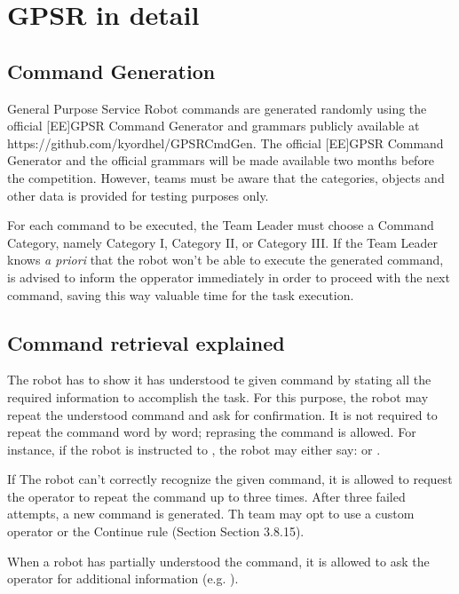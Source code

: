 \chapter{GPSR in detail}
\label{chap:gpsr-appendix}

\section{Command Generation}
General Purpose Service Robot commands are generated randomly using the official [EE]GPSR Command Generator and grammars publicly available at https://github.com/kyordhel/GPSRCmdGen. The official [EE]GPSR Command Generator and the official grammars will be made available two months before the competition. However, teams must be aware that the categories, objects and other data is provided for testing purposes only.

For each command to be executed, the Team Leader must choose a Command Category, namely Category I, Category II, or Category III. If the Team Leader knows \textit{a priori} that the robot won't be able to execute the generated command, is advised to inform the opperator immediately in order to proceed with the next command, saving this way valuable time for the task execution.

\section{Command retrieval explained}
The robot has to show it has understood te given command by stating all the required information to accomplish the task. For this purpose, the robot may repeat the understood command and ask for confirmation. It is not required to repeat the command word by word; reprasing the command is allowed. For instance, if the robot is instructed to , the robot may either say: \textit{} or \textit{}.

If The robot can't correctly recognize the given command, it is allowed to request the operator to repeat the command up to three times. After three failed attempts, a new command is generated. Th team may opt to use a custom operator or the Continue rule (Section Section 3.8.15).

When a robot has partially understood the command, it is allowed to ask the operator for additional information (e.g. \textit{}).

